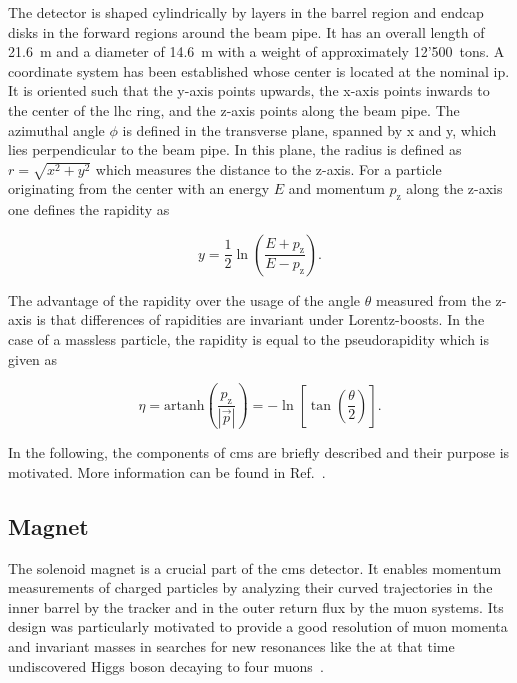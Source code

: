 
The detector is shaped cylindrically by layers in the barrel region and endcap disks in the forward regions around the beam pipe. It has an overall length of 21.6~m and a diameter of 14.6~m with a weight of approximately 12'500~tons. A coordinate system has been established whose center is located at the nominal \gls{ip}. It is oriented such that the y-axis points upwards, the x-axis points inwards to the center of the \gls{lhc} ring, and the z-axis points along the beam pipe. The azimuthal angle $\phi$ is defined in the transverse plane, spanned by x and y, which lies perpendicular to the beam pipe. In this plane, the radius is defined as $r=\sqrt{x^2+y^2}$ which measures the distance to the z-axis. For a particle originating from the center with an energy $E$ and momentum $p_\mathrm{z}$ along the z-axis one defines the rapidity as

\begin{equation}
y=\frac{1}{2}\ln\left(\frac{E+p_\mathrm{z}}{E-p_\mathrm{z}}\right). \label{eq:experiment-rapidity}
\end{equation}

The advantage of the rapidity over the usage of the angle $\theta$ measured from the z-axis is that differences of rapidities are invariant under Lorentz-boosts. In the case of a massless particle, the rapidity is equal to the pseudorapidity which is given as

\begin{equation}
\eta=\mathrm{artanh}\left(\frac{p_\mathrm{z}}{|\vec{p}|}\right)=-\ln\left[\tan\left(\frac{\theta}{2}\right)\right]. \label{eq:experiment-pseudorapidity}
\end{equation}

In the following, the components of \gls{cms} are briefly described and their purpose is motivated. More information can be found in Ref.~\cite{Chatrchyan:2008aa,Bayatian:922757}.


\subsection{Magnet}

The solenoid magnet is a crucial part of the \gls{cms} detector. It enables momentum measurements of charged particles by analyzing their curved trajectories in the inner barrel by the tracker and in the outer return flux by the muon systems. Its design was particularly motivated to provide a good resolution of muon momenta and invariant masses in searches for new resonances like the at that time undiscovered Higgs boson decaying to four muons~\cite{Acquistapace:1997fm}. 

